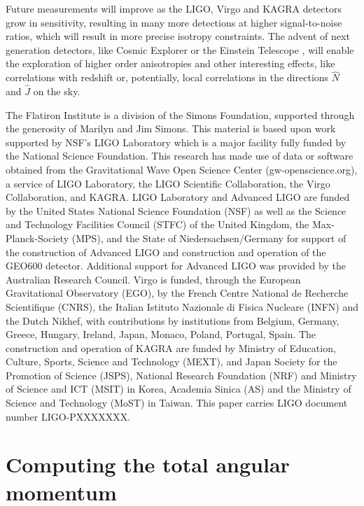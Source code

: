 \documentclass[aps,prd,twocolumn,superscriptaddress,preprintnumbers,floatfix,nofootinbib]{revtex4-2}
\newcommand{\dcc}{LIGO-PXXXXXXX}
\begin{document}
Future measurements will improve as the LIGO, Virgo and KAGRA detectors grow in sensitivity, resulting in many more detections at higher signal-to-noise ratios, which will result in more precise isotropy constraints.
The advent of next generation detectors, like Cosmic Explorer \cite{Dwyer:2014fpa,Evans:2016mbw,Reitze:2019iox} or the Einstein Telescope \cite{Punturo:2010zz}, will enable the exploration of higher order anisotropies and other interesting effects, like correlations with redshift or, potentially, local correlations in the directions $\hat{N}$ and $\hat{J}$ on the sky.

\begin{acknowledgments}
The Flatiron Institute is a division of the Simons Foundation, supported through the generosity of Marilyn and Jim Simons.
This material is based upon work supported by NSF's LIGO Laboratory which is a major facility fully funded by the National Science Foundation.
This research has made use of data or software obtained from the Gravitational Wave Open Science Center (gw-openscience.org), a service of LIGO Laboratory, the LIGO Scientific Collaboration, the Virgo Collaboration, and KAGRA. LIGO Laboratory and Advanced LIGO are funded by the United States National Science Foundation (NSF) as well as the Science and Technology Facilities Council (STFC) of the United Kingdom, the Max-Planck-Society (MPS), and the State of Niedersachsen/Germany for support of the construction of Advanced LIGO and construction and operation of the GEO600 detector. Additional support for Advanced LIGO was provided by the Australian Research Council. Virgo is funded, through the European Gravitational Observatory (EGO), by the French Centre National de Recherche Scientifique (CNRS), the Italian Istituto Nazionale di Fisica Nucleare (INFN) and the Dutch Nikhef, with contributions by institutions from Belgium, Germany, Greece, Hungary, Ireland, Japan, Monaco, Poland, Portugal, Spain. The construction and operation of KAGRA are funded by Ministry of Education, Culture, Sports, Science and Technology (MEXT), and Japan Society for the Promotion of Science (JSPS), National Research Foundation (NRF) and Ministry of Science and ICT (MSIT) in Korea, Academia Sinica (AS) and the Ministry of Science and Technology (MoST) in Taiwan.
This paper carries LIGO document number \dcc{}.
\end{acknowledgments}

\appendix

\section{Computing the total angular momentum}
\label{app:j}
\end{document}
